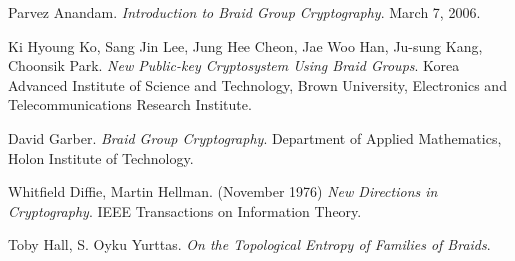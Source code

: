 \documentclass{article}
\theoremstyle{definition}
\begin{document}
\begin{thebibliography}{9}

Parvez Anandam. 
\textit{Introduction to Braid Group Cryptography}. 
March 7, 2006.
 
Ki Hyoung Ko, Sang Jin Lee, Jung Hee Cheon, Jae Woo Han, Ju-sung Kang, Choonsik Park.
\textit{New Public-key Cryptosystem Using Braid Groups}.
Korea Advanced Institute of Science and Technology, Brown University, Electronics and Telecommunications Research Institute. 

David Garber.
\textit{Braid Group Cryptography}.
Department of Applied Mathematics, Holon Institute of Technology. 
 
Whitfield Diffie, Martin Hellman. (November 1976)
\textit{New Directions in Cryptography}.
IEEE Transactions on Information Theory.


Toby Hall, S. Oyku Yurttas.
\textit{On the Topological Entropy of Families of Braids}.
\end{thebibliography}







	
\end{document}
